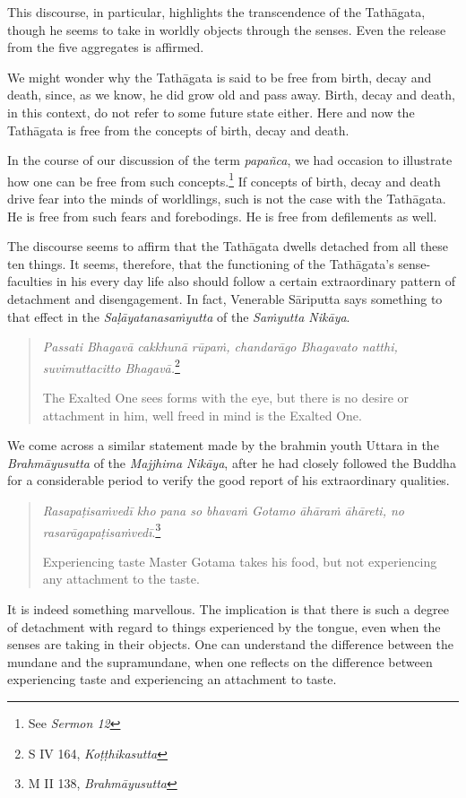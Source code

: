 This discourse, in particular, highlights the transcendence of the Tathāgata, though he seems to take in worldly objects through the senses. Even the release from the five aggregates is affirmed.

We might wonder why the Tathāgata is said to be free from birth, decay and death, since, as we know, he did grow old and pass away. Birth, decay and death, in this context, do not refer to some future state either. Here and now the Tathāgata is free from the concepts of birth, decay and death.

In the course of our discussion of the term \emph{papañca}, we had occasion to illustrate how one can be free from such concepts.\footnote{See \emph{Sermon 12}} If concepts of birth, decay and death drive fear into the minds of worldlings, such is not the case with the Tathāgata. He is free from such fears and forebodings. He is free from defilements as well.

The discourse seems to affirm that the Tathāgata dwells detached from all these ten things. It seems, therefore, that the functioning of the Tathāgata's sense-faculties in his every day life also should follow a certain extraordinary pattern of detachment and disengagement. In fact, Venerable Sāriputta says something to that effect in the \emph{Saḷāyatanasaṁyutta} of the \emph{Saṁyutta Nikāya}.

\begin{quote}
\emph{Passati Bhagavā cakkhunā rūpaṁ, chandarāgo Bhagavato natthi, suvimuttacitto Bhagavā.}\footnote{S IV 164, \emph{Koṭṭhikasutta}}

The Exalted One sees forms with the eye, but there is no desire or attachment in him, well freed in mind is the Exalted One.
\end{quote}

We come across a similar statement made by the brahmin youth Uttara in the \emph{Brahmāyusutta} of the \emph{Majjhima Nikāya}, after he had closely followed the Buddha for a considerable period to verify the good report of his extraordinary qualities.

\begin{quote}
\emph{Rasapaṭisaṁvedī kho pana so bhavaṁ Gotamo āhāraṁ āhāreti, no rasarāgapaṭisaṁvedī}.\footnote{M II 138, \emph{Brahmāyusutta}}

Experiencing taste Master Gotama takes his food, but not experiencing any attachment to the taste.
\end{quote}

It is indeed something marvellous. The implication is that there is such a degree of detachment with regard to things experienced by the tongue, even when the senses are taking in their objects. One can understand the difference between the mundane and the supramundane, when one reflects on the difference between experiencing taste and experiencing an attachment to taste.

